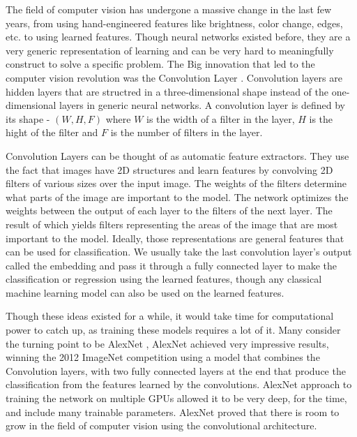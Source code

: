 \documentclass[../main.tex]{subfiles}
\begin{document}
The field of computer vision has undergone a massive change in the last few years, from using hand-engineered features like brightness,
color change, edges, etc. to using learned features. Though neural networks existed before,
they are a very generic representation of learning and can be very hard to meaningfully construct to solve a specific problem.
The Big innovation that led to the computer vision revolution was the Convolution Layer \cite{originalcnn, understanding-cnn}.
Convolution layers are hidden layers that are structred in a three-dimensional shape instead of the one-dimensional layers in generic neural networks.
A convolution layer is defined by its shape - $(W,H,F)$ where $W$ is the width of a filter in the layer, $H$ is the hight of the filter and 
$F$ is the number of filters in the layer.
\par

Convolution Layers can be thought of as automatic feature extractors. They use the fact that images have 2D structures and learn features by
convolving 2D filters of various sizes over the input image. The weights of the filters determine what parts of the image are important to the model. 
The network optimizes the weights between the output of each layer to the filters of the next layer. The result of which yields filters
representing the areas of the image that are most important to the model.
Ideally, those representations are general features that can be used for classification. We usually take the last convolution layer's output
called the embedding and pass it through a fully connected layer to make the classification or regression using the learned features,
though any classical machine learning model can also be used on the learned features. 
\par

Though these ideas existed for a while, it would take time for computational power to catch up, as training these models requires a lot of it.
Many consider the turning point to be AlexNet \cite{alexnet}, AlexNet achieved very impressive results, winning the 2012 ImageNet competition using a model that combines the Convolution layers,
with two fully connected layers at the end that produce the classification from the features learned by the convolutions.
AlexNet approach to training the network on multiple GPUs allowed it to be very deep, for the time, and include many trainable parameters.
AlexNet proved that there is room to grow in the field of computer vision using the convolutional architecture.
\par
\end{document}
